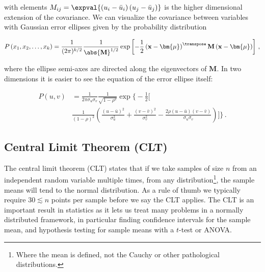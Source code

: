 \noindent with elements $M_{ij} = \expval{\left(u_{i} - \bar{u}_{i}\right)\left(u_{j}-\bar{u}_{j}\right)}$
is the higher dimensional extension of the covariance.
We can visualize the covariance between variables with
Gaussian error ellipses given by the probability distribution

\begin{equation}\label{eq:stats:P_error_ellipse_k}
P\left(x_{1},x_{2},\ldots,x_{k}\right) = \frac{1}{(2\pi)^{k/2}}\frac{1}{\abs{\mathbf{M}}^{1/2}}\exp\left[-\frac{1}{2}\left(\mathbf{x}-\bm{\mu}\right)^{\transpose}\mathbf{M}\left(\mathbf{x}-\bm{\mu}\right)\right]\,,
\end{equation}

\noindent where the ellipse semi-axes are directed along the eigenvectors of $\mathbf{M}$.
In two dimensions it is easier to see the equation of the error ellipse itself:

\begin{equation}\label{eq:stats:P_error_ellipse_2}
\begin{split}
P\left(u,v\right) &= \frac{1}{2\pi\sigma_{u}\sigma_{v}}\frac{1}{\sqrt{1-\rho^{2}}}\exp\bigg\{-\frac{1}{2}\bigg[ \\
&\frac{1}{(1-\rho)^{2}}\left(\frac{\left(u-\bar{u}\right)^{2}}{\sigma_{u}^{2}}+\frac{\left(v-\bar{v}\right)^{2}}{\sigma_{v}^{2}}-\frac{2\rho \left(u-\bar{u}\right)\left(v-\bar{v}\right)}{\sigma_{u}\sigma_{v}}\right)\bigg]\bigg\}\,.
\end{split}
\end{equation}

\subsection{Central Limit Theorem (CLT)}
\label{additional:stats:CLT}

The central limit theorem (CLT) states that
if we take samples of size $n$ from an independent random variable multiple times,
from any distribution\footnote{Where the mean is defined, \ie not the Cauchy or other pathological distributions.},
the sample means will tend to the normal distribution.
As a rule of thumb we typically require $\num{30} \lesssim n$ points per sample before we say the CLT applies.
The CLT is an important result in statistics as it lets us
treat many problems in a normally distributed framework,
in particular finding confidence intervals for the sample mean,
and hypothesis testing for sample means with a $t$-test or ANOVA.

